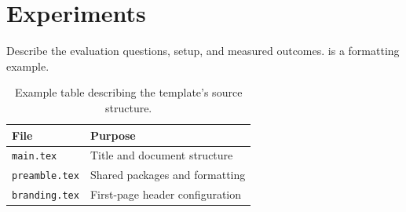 \section{Experiments}
\label{sec:experiments}
Describe the evaluation questions, setup, and measured outcomes.
 is a formatting example.

\begin{table}[htbp]
  \centering
  \caption{Example table describing the template's source structure.}
  \label{tab:structure}
  \begin{tabular}{@{}ll@{}}
    \toprule
    File & Purpose \\
    \midrule
    \texttt{main.tex} & Title and document structure \\
    \texttt{preamble.tex} & Shared packages and formatting \\
    \texttt{branding.tex} & First-page header configuration \\
    \bottomrule
  \end{tabular}
\end{table}

